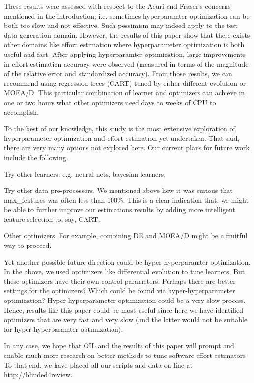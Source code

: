 These results were assessed with respect to the  Acuri and  Fraser's concerns mentioned in the introduction; i.e. sometimes
hyperparamter optimization can be both too slow and not effective.
Such pessimism    may indeed apply  to  the  test  data  generation  domain.
However, 
the results of this paper show that 
 there  exists
other domains like effort estimation where hyperparameter
optimization  is  both
useful
and
fast. After  applying  hyperparamter optimization,  large  improvements  in  effort
estimation  accuracy  were  observed  (measured  in  terms  of  the
magnitude  of  the  relative  error  and  standardized  accuracy).
From those results, we can recommend using regression trees
(CART)  tuned  by  either  different  evolution  or  MOEA/D.  This
particular combination of learner and optimizers can achieve
in  one  or  two  hours  what  other  optimizers  need  days  to  weeks
of  CPU  to  accomplish.

To the best of our knowledge,
this study is the most extensive exploration   of
hyperparameter optimization and effort estimation yet undertaken. That said, there are very many
options not explored here. Our current
plans for future work include the following.
\bi
\item Try other learners:
e.g. neural nets, bayesian learners;
\item Try other data pre-processors.
We mentioned above how it was curious that
max\_features was often less than 100\%.
This is a clear indication that, we
might be able to further improve our estimations results by adding
more intelligent feature selection to, say, CART.
\item Other optimizers. For example,
combining DE and MOEA/D might be a fruitful way
to proceed.
\item Yet another possible future direction
could be hyper-hyperparamter optimization. In
the above, we used optimizers like differential
evolution to tune learners. But these optimizers
have their own control parameters. Perhaps there 
are better settings for the optimizers? Which could be found via hyper-hyperparameter optimization?
\ei
Hyper-hyperparameter optimization could be a very slow
process. Hence, results like this paper could be
most useful since here we have identified
optimizers that are
very fast and very slow (and the latter would
not be suitable for hyper-hyperparamter optimization).

In any case,
we  hope  that
OIL  and the results of this paper will  prompt  and  enable
much more research on better methods to tune software effort
estimators
To that end, we have placed all our scripts and data   on-line at http://blinded4review.

